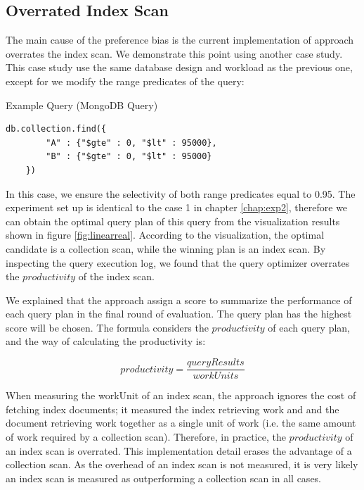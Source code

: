 \subsection{Overrated Index Scan}
The main cause of the preference bias is the current implementation of \approachName approach overrates the index scan. We demonstrate this point using another case study. This case study use the same database design and workload as the previous one, except for we modify the range predicates of the query:

\vspace{0.02\linewidth}
\begin{algorithm}[htbp]
\caption{Example Query (MongoDB Query)}
\begin{verbatim}
db.collection.find({
        "A" : {"$gte" : 0, "$lt" : 95000},
        "B" : {"$gte" : 0, "$lt" : 95000}
    })
\end{verbatim}
\label{query_mongo}
\end{algorithm}

In this case, we ensure the selectivity of both range predicates equal to 0.95. The experiment set up is identical to the case 1 in chapter \ref{chap:exp2}, therefore we can obtain the optimal query plan of this query from the visualization results shown in figure \ref{fig:linearreal}. According to the visualization, the optimal candidate is a collection scan, while the winning plan is an index scan. By inspecting the query execution log, we found that the query optimizer overrates the $productivity$ of the index scan.

We explained that the \approachName approach assign a score to summarize the performance of each query plan in the final round of evaluation. The query plan has the highest score will be chosen. The formula considers the $productivity$ of each query plan, and the way of calculating the productivity is:

\begin{equation}
    productivity = \frac{queryResults}{workUnits}
\end{equation}

When measuring the workUnit of an index scan, the \approachName approach ignores the cost of fetching index documents; it measured the index retrieving work and and the document retrieving work together as a single unit of work (i.e. the same amount of work required by a collection scan). Therefore, in practice, the $productivity$ of an index scan is overrated. This implementation detail erases the advantage of a collection scan. As the overhead of an index scan is not measured, it is very likely an index scan is measured as outperforming a collection scan in all cases.


